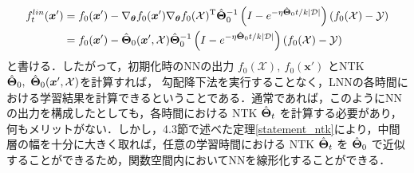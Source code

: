 \begin{align}
    f_t^{lin}(\bm{x}') &= f_0(\bm{x}') - \nabla_{\bm{\theta}}f_0(\bm{x}')\nabla_{\bm{\theta}}f_0(\mathcal{X})^{\mathrm{T}}\hat{\bm{\Theta}}_{0}^{-1}\left(I - e^{-\eta\hat{\bm{\Theta}}_0 t/k|\mathcal{D}|}\right)(f_0(\mathcal{X})- \mathcal{Y}) \\
    &= f_0(\bm{x}') - \hat{\bm{\Theta}}_0(\bm{x}', \mathcal{X}) \hat{\bm{\Theta}}_0^{-1}\left(I - e^{-\eta\hat{\bm{\Theta}}_0 t/k|\mathcal{D}|}\right)(f_0(\mathcal{X})- \mathcal{Y})
\end{align}
と書ける．したがって，初期化時のNNの出力 $f_0(\mathcal{X}), \ f_0(\bm{x}')$ とNTK $\hat{\NTK}_0, \ \hat{\NTK}_0(\bm{x}',\mathcal{X})$を計算すれば， 勾配降下法を実行することなく，LNNの各時間における学習結果を計算できるということである．通常であれば，このようにNNの出力を構成したとしても，各時間における NTK $\hat{\bm{\Theta}}_t$ を計算する必要があり，何もメリットがない．しかし，4.3節で述べた定理\ref{statement_ntk}により，中間層の幅を十分に大きく取れば，任意の学習時間における NTK $\hat{\bm{\Theta}}_t$ を $\hat{\bm{\Theta}}_0$ で近似することができるため，関数空間内においてNNを線形化することができる．